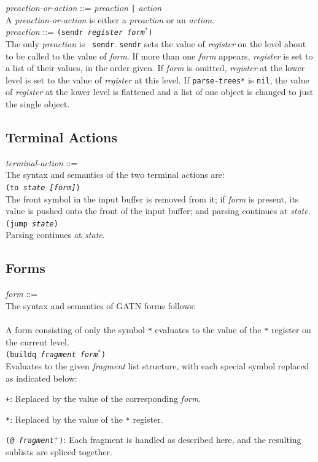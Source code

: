 \documentclass{book}
\begin{document}
{\it preaction-or-action} ::= {\it preaction} \verb.|. {\it action} \\
A {\it preaction-or-action} is either a {\it preaction} or an {\it action}. \\[2ex]
{\it preaction} ::= {\tt (sendr {\it register form$^*$})} \\ The only {\it preaction} is {\tt
sendr}.  {\tt sendr} sets the value of {\it register} on the level about to be called to the value
of {\it form}.  If more than one {\it form} appears, {\it register} is set to a list of their
values, in the order given.  If {\it form} is omitted, {\it register} at the lower level is set to
the value of {\it register} at this level.  If {\tt *parse-trees*} is {\tt nil}, the value of {\it
register} at the lower level is flattened and a list of one object is changed to just the single
object.

\subsection{Terminal Actions}

{\it terminal-action} ::= \\
The syntax and semantics of the two terminal actions are: \\[2ex]
{\tt (to {\it state [form]\/})} \\ The front symbol in the input buffer is removed from it; if {\it
form} is present, its value is pushed onto the front of the input buffer; and parsing continues at
{\it state}. \\[2ex]
{\tt (jump {\it state})} \\ Parsing continues at {\it state}.

\subsection{Forms}

{\it form} ::= \\
The syntax and semantics of GATN forms follows: \\[2ex]
{\tt *} \\ A form consisting of only the symbol \verb|*| evaluates to the value of the \verb|*|
register on the current level. \\[2ex]
{\tt (buildq {\it fragment form$^*$})} \\
Evaluates to the given {\it fragment} list structure, with each special symbol replaced as indicated
below:
\begin{description}
\item{\verb|+|:} Replaced by the value of the corresponding {\it form}.
\item{\verb|*|:} Replaced by the value of the \verb|*| register.
\item{{\tt (@ {\it fragment}$^+$)}:} Each fragment is handled as described here, and the resulting
sublists are spliced together.
\end{description}
\end{document}
